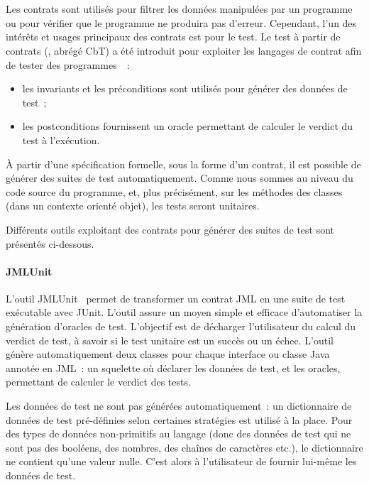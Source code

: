 \section{}
\label{section:sota:cbt}

Les contrats sont utilisés pour {\strong filtrer} les données manipulées par un
programme ou pour vérifier que le programme ne produira pas d'erreur. Cependant,
l'un des intérêts et usages principaux des contrats est pour le test. Le
{\strong test à partir de contrats} (, abrégé
CbT) a été introduit pour exploiter les langages de contrat afin de tester des
programmes~~:
%
\begin{itemize}

\item les invariants et les préconditions sont utilisés pour {\strong générer
des données} de test~;

\item les postconditions {\strong fournissent un oracle} permettant de calculer
le verdict du test à l'exécution.

\end{itemize}
%
À partir d'une spécification formelle, sous la forme d'un contrat, il est
possible de générer des suites de test automatiquement. Comme nous sommes au
niveau du code source du programme, et, plus précisément, sur les méthodes des
classes (dans un contexte orienté objet), les tests seront {\strong unitaires}.

Différents outils exploitant des contrats pour générer des suites de test sont
présentés ci-dessous.

\paragraph{JMLUnit} L'outil JMLUnit~ permet de
transformer un contrat JML en une suite de test exécutable avec JUnit. L'outil
assure un moyen simple et efficace d'automatiser la génération d'oracles de
test. L'objectif est de décharger l'utilisateur du calcul du verdict de test, à
savoir si le test unitaire est un succès ou un échec. L'outil génère
automatiquement deux classes pour chaque interface ou classe Java annotée en
JML~: un squelette où déclarer les données de test, et les oracles, permettant
de calculer le verdict des tests.

Les données de test ne sont pas générées automatiquement~: un dictionnaire de
données de test pré-définies selon certaines stratégies est utilisé à la place.
Pour des types de données non-primitifs au langage (donc des données de test
qui ne sont pas des booléens, des nombres, des chaînes de caractères etc.), le
dictionnaire ne contient qu'une valeur nulle. C'est alors à l'utilisateur de
fournir lui-même les données de test.

